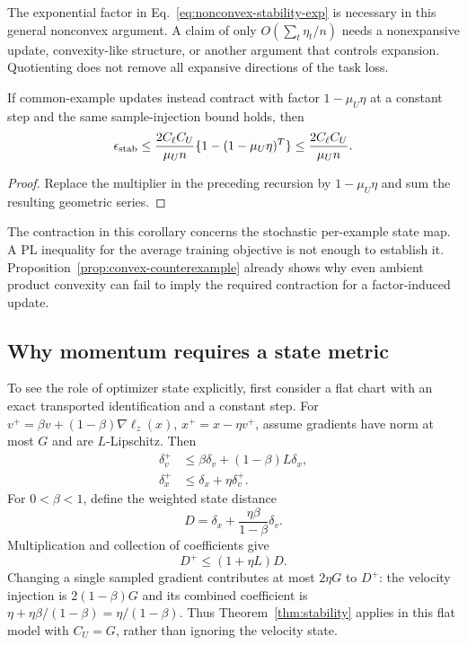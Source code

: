 The exponential factor in Eq.~\eqref{eq:nonconvex-stability-exp} is
necessary in this general nonconvex argument. A claim of only
$O(\sum_t\eta_t/n)$ needs a nonexpansive update, convexity-like structure,
or another argument that controls expansion. Quotienting does not remove
all expansive directions of the task loss.

\begin{corollary}
\label{cor:contractive-stability}
If common-example updates instead contract with factor $1-\mu_U\eta$
at a constant step and the same sample-injection bound holds, then
\begin{equation}
 \epsilon_{\rm stab}\leq
 \frac{2C_\ell C_U}{\mu_Un}
       \{1-(1-\mu_U\eta)^T\}
 \leq\frac{2C_\ell C_U}{\mu_Un}.
 \label{eq:contractive-stability}
\end{equation}
\end{corollary}
\begin{proof}
Replace the multiplier in the preceding recursion by
$1-\mu_U\eta$ and sum the resulting geometric series.
\end{proof}

The contraction in this corollary concerns the stochastic per-example state
map. A PL inequality for the average training objective is not enough to
establish it. Proposition~\ref{prop:convex-counterexample} already shows
why even ambient product convexity can fail to imply the required
contraction for a factor-induced update.

\subsection{Why momentum requires a state metric}
To see the role of optimizer state explicitly, first consider a flat chart
with an exact transported identification and a constant step. For
$v^+=\beta v+(1-\beta)\nabla\ell_z(x)$, $x^+=x-\eta v^+$,
assume gradients have norm at most $G$ and are $L$-Lipschitz. Then
\begin{align}
 \delta_v^+&\leq\beta\delta_v+(1-\beta)L\delta_x,\\
 \delta_x^+&\leq\delta_x+\eta\delta_v^+.
\end{align}
For $0<\beta<1$, define the weighted state distance
\begin{equation}
 D=\delta_x+\frac{\eta\beta}{1-\beta}\delta_v.
 \label{eq:momentum-state-metric}
\end{equation}
Multiplication and collection of coefficients give
\begin{equation}
 D^+\leq(1+\eta L)D.
 \label{eq:momentum-state-lipschitz}
\end{equation}
Changing a single sampled gradient contributes at most $2\eta G$ to $D^+$:
the velocity injection is $2(1-\beta)G$ and its combined coefficient is
$\eta+\eta\beta/(1-\beta)=\eta/(1-\beta)$.
Thus Theorem~\ref{thm:stability} applies in this flat model with
$C_U=G$, rather than ignoring the velocity state.

